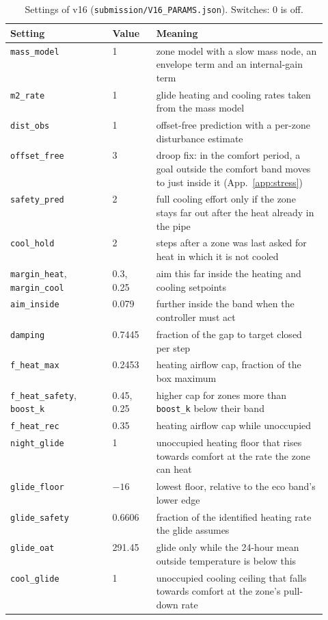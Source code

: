 \documentclass{article}
\begin{document}
\begin{table}[H]\centering
\caption{Settings of v16 (\texttt{submission/V16\_PARAMS.json}). Switches: 0 is off.}\label{tab:settings}
\footnotesize
\begin{tabular}{llp{0.54\linewidth}}\toprule
Setting & Value & Meaning\\\midrule
\texttt{mass\_model} & 1 & zone model with a slow mass node, an envelope term and an internal-gain term\\
\texttt{m2\_rate} & 1 & glide heating and cooling rates taken from the mass model\\
\texttt{dist\_obs} & 1 & offset-free prediction with a per-zone disturbance estimate\\
\texttt{offset\_free} & 3 & droop fix: in the comfort period, a goal outside the comfort band moves to just inside it (App.~\ref{app:stress})\\
\texttt{safety\_pred} & 2 & full cooling effort only if the zone stays far out after the heat already in the pipe\\
\texttt{cool\_hold} & 2 & steps after a zone was last asked for heat in which it is not cooled\\
\texttt{margin\_heat}, \texttt{margin\_cool} & 0.3, 0.25 & aim this far inside the heating and cooling setpoints\\
\texttt{aim\_inside} & 0.079 & further inside the band when the controller must act\\
\texttt{damping} & 0.7445 & fraction of the gap to target closed per step\\
\texttt{f\_heat\_max} & 0.2453 & heating airflow cap, fraction of the box maximum\\
\texttt{f\_heat\_safety}, \texttt{boost\_k} & 0.45, 0.25 & higher cap for zones more than \texttt{boost\_k} below their band\\
\texttt{f\_heat\_rec} & 0.35 & heating airflow cap while unoccupied\\
\texttt{night\_glide} & 1 & unoccupied heating floor that rises towards comfort at the rate the zone can heat\\
\texttt{glide\_floor} & $-16$ & lowest floor, relative to the eco band's lower edge\\
\texttt{glide\_safety} & 0.6606 & fraction of the identified heating rate the glide assumes\\
\texttt{glide\_oat} & 291.45 & glide only while the 24-hour mean outside temperature is below this\\
\texttt{cool\_glide} & 1 & unoccupied cooling ceiling that falls towards comfort at the zone's pull-down rate\\

\end{tabular}
\end{table}
\end{document}
